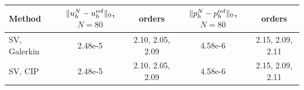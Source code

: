 \begin{tabular}{lcccc}
\toprule
Method & $\|u_h^N-u_h^{\rm ref}\|_0$, $N=80$ & orders & $\|p_h^N-p_h^{\rm ref}\|_0$, $N=80$ & orders \\
\midrule
SV, Galerkin & 2.48e-5 & 2.10, 2.05, 2.09 & 4.58e-6 & 2.15, 2.09, 2.11 \\
SV, CIP & 2.48e-5 & 2.10, 2.05, 2.09 & 4.58e-6 & 2.15, 2.09, 2.11 \\
\bottomrule
\end{tabular}
